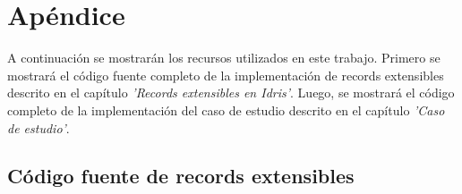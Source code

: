 
\chapter{Apéndice}
\label{ch:7}

A continuación se mostrarán los recursos utilizados en este trabajo. Primero se mostrará el código fuente completo de la implementación de records extensibles descrito en el capítulo \textit{'Records extensibles en Idris'}. Luego, se mostrará el código completo de la implementación del caso de estudio descrito en el capítulo \textit{'Caso de estudio'}.

\section{Código fuente de records extensibles}

